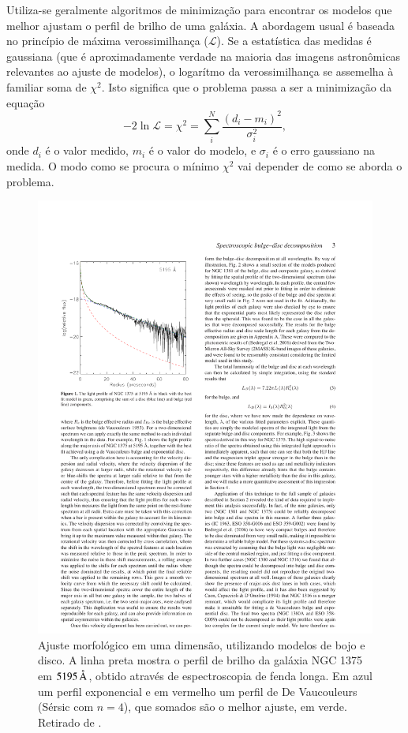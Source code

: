 Utiliza-se geralmente algoritmos de minimização para encontrar os modelos que
melhor ajustam o perfil de brilho de uma galáxia. A abordagem usual é baseada no
princípio de máxima verossimilhança ($\mathcal{L}$). Se a estatística das
medidas é gaussiana (que é aproximadamente verdade na maioria das imagens
astronômicas relevantes ao ajuste de modelos), o logarítmo da verossimilhança se
assemelha à familiar soma de $\chi^2$\citep[seção 4.1.2]{Erwin2015}. Isto
significa que o problema passa a ser a minimização da equação
\begin{equation*}
-2\ln\mathcal{L} = \chi^2 = \sum_i^N \frac{\left(d_i -
m_i\right)^2}{\sigma_i^2},
\end{equation*}
onde $d_i$ é o valor medido, $m_i$ é o valor do modelo, e $\sigma_i$ é o erro
gaussiano na medida. O modo como se procura o mínimo $\chi^2$ vai depender de
como se aborda o problema.

\begin{figure}
	\includegraphics{figuras/johnston-decomp}
	\caption[Ajuste morfológico em uma dimensão] {Ajuste morfológico
	em uma dimensão, utilizando modelos de bojo e disco. A linha preta mostra o
	perfil de brilho da galáxia NGC 1375 em $5195\,\text{\normalfont\AA}$, obtido através de
	espectroscopia de fenda longa. Em azul um perfil exponencial e em vermelho um
	perfil de De Vaucouleurs (Sérsic com $n=4$), que somados são o melhor ajuste,
	em verde. Retirado de \citet{Johnston2012}.}
	\label{fig:decompJohnston}
\end{figure}

